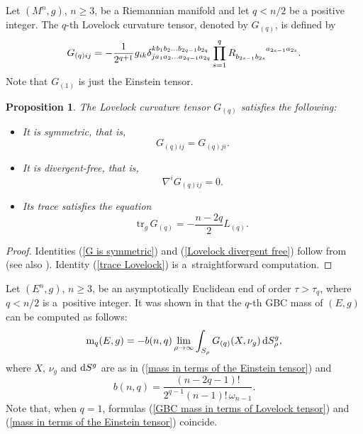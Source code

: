 \documentclass[pdftex]{sigma}
\numberwithin{equation}{section}
\newtheorem{Proposition}[Theorem]{Proposition}
\begin{document}
Let $(M^n,g)$, $n \geq 3$, be a Riemannian manifold and let $q < n/2$ be a positive integer. The $q$-th Lovelock curvature tensor, denoted by $G_{(q)}$, is defined by
\begin{equation} \label{Lovelock tensor}
 G_{(q)ij} = - \frac{1}{2^{q + 1}} g_{ik}
 \delta_{j a_1 a_2 \ldots a_{2q - 1} a_{2q}}^{k b_1 b_2 \ldots b_{2q - 1} b_{2q}}
 \prod_{s = 1}^{q} \tensor[]{R}{_{b_{2s - 1} b_{2s}}^{a_{2s - 1} a_{2s}}}.
\end{equation}
Note that $G_{(1)}$ is just the Einstein tensor.
\begin{Proposition}
 The Lovelock curvature tensor $G_{(q)}$ satisfies the following:
 \begin{itemize}\itemsep=0pt
 \item[$(i)$] It is symmetric, that is,
  \begin{equation} \label{G is symmetric}
   G_{(q)ij} = G_{(q)ji}.
  \end{equation}
 \item[$(ii)$] It is divergent-free, that is,
  \begin{equation} \label{Lovelock divergent free}
   \nabla^iG_{(q)ij} = 0.
  \end{equation}
 \item[$(iii)$] Its trace satisfies the equation
  \begin{equation} \label{trace Lovelock}
   \mathrm{tr}_g \, G_{(q)} = - \frac{n-2q}{2} L_{(q)}.
  \end{equation}
 \end{itemize}
\end{Proposition}
\begin{proof}
   Identities (\ref{G is symmetric}) and (\ref{Lovelock divergent free}) follow from \cite[Theorem~1]{Lovelock71} (see also \cite{Lovelock70}). Identity (\ref{trace Lovelock}) is a~straightforward computation.
\end{proof}

Let $(E^n,g)$, $n \geq 3$, be an asymptotically Euclidean end of order $\tau > \tau_q$, where $q < n/2$ is a~positive integer. It was shown in \cite{WangWuChernsmagicform} that the $q$-th GBC mass of $(E,g)$ can be computed as follows:
\begin{equation} \label{GBC mass in terms of Lovelock tensor}
  \mathrm{m}_q(E,g) = -b(n,q) \lim_{\rho \to \infty} \int_{S_\rho} G_{(q)} (X, \nu_g) \, {\rm d}S_\rho^g,
\end{equation}
where $X$, $\nu_g$ and ${\rm d}S^g$ are as in (\ref{mass in terms of the Einstein tensor}) and
\begin{equation*}
  b(n,q) = \frac{(n - 2q - 1)!}{2^{q-1}(n-1)! \, \omega_{n-1}}.
\end{equation*}
Note that, when $q=1$, formulas (\ref{GBC mass in terms of Lovelock tensor}) and (\ref{mass in terms of the Einstein tensor}) coincide.
\end{document}
